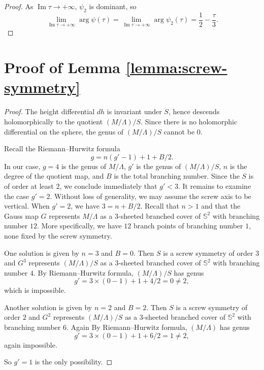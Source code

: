 \documentclass[a4paper]{amsart}
\newcommand{\im}{\operatorname{Im}}
\theoremstyle{plain}
\theoremstyle{definition}
\begin{document}
\begin{proof}
		As $\im \tau \to +\infty$, $\psi_2$ is dominant, so
		\[
			\lim_{\im\tau \to +\infty} \arg \psi(\tau) =
			\lim_{\im\tau \to +\infty} \arg \psi_2(\tau) = \frac{1}{2} - \frac{\tau}{3}.
		\]
	\end{proof}

	\section{Proof of Lemma \ref{lemma:screw-symmetry}}\label{sec:proof-of-lemma-screw}
	\begin{proof}
		The height differential $dh$ is invariant under $S$, hence descends
		holomorphically to the quotient $(M/\Lambda)/S$.  Since there is no
		holomorphic differential on the sphere, the genus of $(M/\Lambda)/S$ cannot
		be $0$.

		Recall the Riemann--Hurwitz formula
		\[
			g = n(g' - 1) + 1 + B/2.
		\]
		In our case, $g=4$ is the genus of $M/\Lambda$, $g'$ is the genus of
		$(M/\Lambda)/S$, $n$ is the degree of the quotient map, and $B$ is the total
		branching number.  Since the $S$ is of order at least $2$, we conclude
		immediately that $g' < 3$.  It remains to examine the case $g'=2$.  Without
		loss of generality, we may assume the screw axis to be vertical.  When
		$g'=2$, we have $3 = n + B/2$.  Recall that $n>1$ and that the Gauss map $G$
    represents $M/\Lambda$ as a $3$-sheeted branched cover of $\mathbb{S}^2$
    with branching number $12$.  More specifically, we have $12$ branch points
    of branching number $1$, none fixed by the screw symmetry.

		One solution is given by $n=3$ and $B=0$.  Then $S$ is a screw symmetry of
		order $3$ and $G^3$ represents $(M/\Lambda)/S$ as a $3$-sheeted branched
		cover of $\mathbb{S}^2$ with branching number $4$.  By Riemann--Hurwitz
		formula, $(M/\Lambda)/S$ has genus
    \[
    	g' = 3 \times (0 - 1) + 1 + 4/2 = 0 \ne 2,
    \]
    which is impossible.

		Another solution is given by $n=2$ and $B=2$.  Then $S$ is a screw symmetry
		of order $2$ and $G^2$ represents $(M/\Lambda)/S$ as a $3$-sheeted
		branched cover of $\mathbb{S}^2$ with branching number $6$.  Again By
		Riemann--Hurwitz formula, $(M/\Lambda)$ has genus
    \[
    	g' = 3 \times (0 - 1) + 1 + 6/2 = 1 \ne 2,
    \]
    again impossible.

		So $g'=1$ is the only possibility.
	\end{proof}
\end{document}
